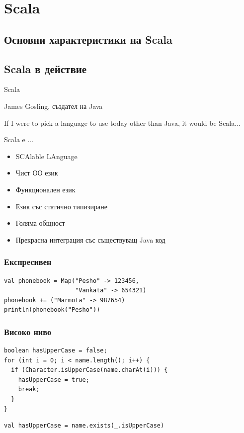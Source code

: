 \documentclass[compress,red]{beamer}
\begin{document}
\section{Scala}
\subsection{Основни характеристики на Scala}
\subsection{Scala в действие}

\begin{frame}{Scala}
  \transdissolve
  \begin{center}
    \begin{block}{James Gosling, създател на Java}
      \begin{center}
        If I were to pick a language
        to use today other than Java,
        it would be Scala...
      \end{center}
    \end{block}    
  \end{center}
\end{frame}

\begin{frame}{Scala e ...}
  \transdissolve
  \begin{itemize}
  \item SCAlable LAnguage
  \item Чист ОО език
  \item Функционален език
  \item Език със статично типизиране
  \item Голяма общност
  \item Прекрасна интеграция със съществуващ Java код
  \end{itemize}
\end{frame}

\begin{frame}[fragile]
  \frametitle{Експресивен}
  \transdissolve
\begin{lstlisting}
val phonebook = Map("Pesho" -> 123456,
                    "Vankata" -> 654321)
phonebook += ("Marmota" -> 987654)
println(phonebook("Pesho"))
\end{lstlisting}
\end{frame}

\begin{frame}[fragile]
  \frametitle{Високо ниво}
  \transdissolve
\begin{lstlisting}
boolean hasUpperCase = false;
for (int i = 0; i < name.length(); i++) {
  if (Character.isUpperCase(name.charAt(i))) {
    hasUpperCase = true;
    break;
  }
}
\end{lstlisting}
\begin{lstlisting}
val hasUpperCase = name.exists(_.isUpperCase)
\end{lstlisting}
\end{frame}
\end{document}
